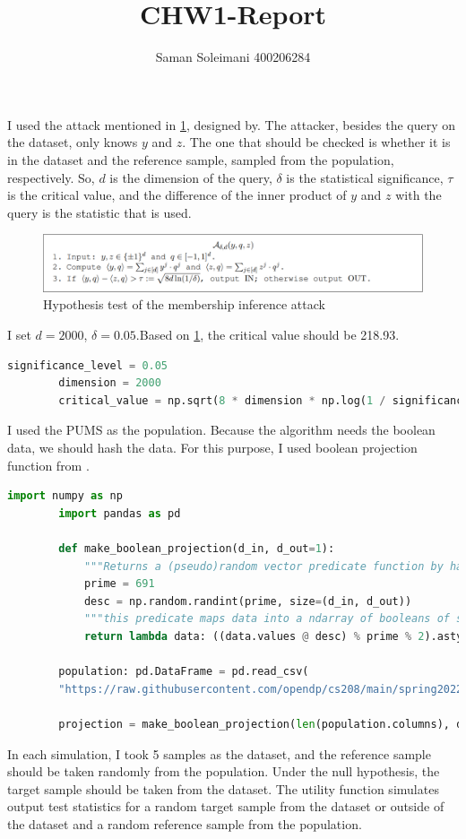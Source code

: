 \documentclass[12pt]{extarticle}
\title{\textbf{CHW1-Report}}
\author{Saman Soleimani 400206284}
\date{}
\begin{document}
	I used the attack mentioned in \ref{fig:fig1}, designed by\cite{dwork2015robust}. The attacker, besides the query on the dataset, only knows $y$ and $z$. The one that should be checked is whether it is in the dataset and the reference sample, sampled from the population, respectively. So, $d$ is the dimension of the query, $\delta$ is the statistical significance, $\tau$ is the critical value, and the difference of the inner product of $y$ and $z$ with the query is the statistic that is used.	
	\begin{figure}[h]
		\centering
		\includegraphics[width=1\textwidth]{im1.png}
		\caption{Hypothesis test of the membership inference attack}
		\label{fig:fig1}
	\end{figure}
	
	I set $d = 2000$, $\delta = 0.05$.Based on \ref{fig:fig1}, the critical value should be 218.93. 
	\begin{lstlisting}[language=Python]	
		significance_level = 0.05
		dimension = 2000
		critical_value = np.sqrt(8 * dimension * np.log(1 / significance_level))		
	\end{lstlisting}	
	  I used the PUMS as the population. Because the algorithm needs the boolean data, we should hash the data. For this purpose, I used boolean projection function from \cite{OpenDPMIA}.
	
	\begin{lstlisting}[language=Python]	
		import numpy as np
		import pandas as pd
		
		def make_boolean_projection(d_in, d_out=1):
			"""Returns a (pseudo)random vector predicate function by hashing data."""
			prime = 691
			desc = np.random.randint(prime, size=(d_in, d_out))
			"""this predicate maps data into a ndarray of booleans of size [n, d_out]	       (where `@` is the dot product and `%` modulus)"""
			return lambda data: ((data.values @ desc) % prime % 2).astype(bool)
		
		population: pd.DataFrame = pd.read_csv(
		"https://raw.githubusercontent.com/opendp/cs208/main/spring2022/data/FultonPUMS5sample100.csv")
		
		projection = make_boolean_projection(len(population.columns), d_out=dimension)
	\end{lstlisting}	
	In each simulation, I took 5 samples as the dataset, and the reference sample should be taken randomly from the population. Under the null hypothesis, the target sample should be taken from the dataset. The utility function simulates output test statistics for a random target sample from the dataset or outside of the dataset and a random reference sample from the population.
	
\end{document}
